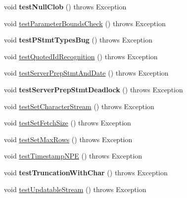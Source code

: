 \begin{DoxyCompactItemize}
void {\bfseries test\+Null\+Clob} ()  throws Exception 
\item 
void \mbox{\hyperlink{classtestsuite_1_1regression_1_1_statement_regression_test_a65351d4c69ec3d81977aabf6069fa827}{test\+Parameter\+Bounds\+Check}} ()  throws Exception 
\item 
\mbox{\label{classtestsuite_1_1regression_1_1_statement_regression_test_a548c9a5b159033c75ac681a3272558d6}} 
void {\bfseries test\+P\+Stmt\+Types\+Bug} ()  throws Exception 
\item 
void \mbox{\hyperlink{classtestsuite_1_1regression_1_1_statement_regression_test_a0ba6d0aec28125228d181d3e3f340247}{test\+Quoted\+Id\+Recognition}} ()  throws Exception 
\item 
void \mbox{\hyperlink{classtestsuite_1_1regression_1_1_statement_regression_test_a95273398ebb6f8ab8e39d8ab7d7d7ec2}{test\+Server\+Prep\+Stmt\+And\+Date}} ()  throws Exception 
\item 
\mbox{\label{classtestsuite_1_1regression_1_1_statement_regression_test_ae4419816a2cf52c9d2e3fe03f6965538}} 
void {\bfseries test\+Server\+Prep\+Stmt\+Deadlock} ()  throws Exception 
\item 
void \mbox{\hyperlink{classtestsuite_1_1regression_1_1_statement_regression_test_a8043401e658d50f132bd6407926ed1f6}{test\+Set\+Character\+Stream}} ()  throws Exception 
\item 
void \mbox{\hyperlink{classtestsuite_1_1regression_1_1_statement_regression_test_a94ba62e42c45e2025b030f3a7f69ea17}{test\+Set\+Fetch\+Size}} ()  throws Exception 
\item 
void \mbox{\hyperlink{classtestsuite_1_1regression_1_1_statement_regression_test_a81fe072b5269fee8c61a3391538282c2}{test\+Set\+Max\+Rows}} ()  throws Exception 
\item 
void \mbox{\hyperlink{classtestsuite_1_1regression_1_1_statement_regression_test_adddbda10c165cfaf7d3ae1266e7a66ab}{test\+Timestamp\+N\+PE}} ()  throws Exception 
\item 
\mbox{\label{classtestsuite_1_1regression_1_1_statement_regression_test_aafc5cbe7d1a8aa3033e86c9f0cd8c08a}} 
void {\bfseries test\+Truncation\+With\+Char} ()  throws Exception 
\item 
void \mbox{\hyperlink{classtestsuite_1_1regression_1_1_statement_regression_test_a7695fd8186a02b78d65dc3af0db02e34}{test\+Updatable\+Stream}} ()  throws Exception 

\end{DoxyCompactItemize}
